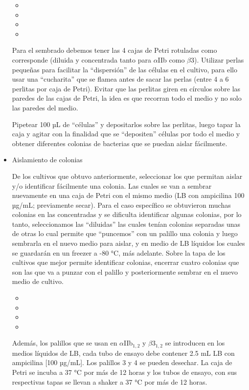 \begin{appendix}
\begin{itemize}
     \begin{itemize}
        \item{}
        \item{}
        \item{}
        \item{}
    \end{itemize}
        

Para el sembrado debemos tener las 4 cajas de Petri rotuladas como corresponde (diluida y concentrada tanto para $\alpha$IIb como $\beta$3). Utilizar perlas pequeñas para facilitar la “dispersión” de las células en el cultivo, para ello usar una “cucharita” que se flamea antes de sacar las perlas (entre 4 a 6 perlitas por caja de Petri). Evitar que las perlitas giren en círculos sobre las paredes de las cajas de Petri, la idea es que recorran todo el medio y no solo las paredes del medio.

Pipetear 100 µL de “células” y depositarlos sobre las perlitas, luego tapar la caja y agitar con la finalidad que se “depositen” células por todo el medio y obtener diferentes colonias de bacterias que se puedan aislar fácilmente. 


\item{Aislamiento de colonias}

De los cultivos que obtuvo anteriormente, seleccionar los que permitan aislar y/o identificar fácilmente una colonia. Las cuales se van a sembrar nuevamente en una caja de Petri con el mismo medio (LB con ampicilina 100 µg/mL; previamente secar). Para el caso específico se obtuvieron muchas colonias en las concentradas y se dificulta identificar algunas colonias, por lo tanto, seleccionamos las “diluidas” las cuales tenían colonias separadas unas de otras lo cual permite que “puncemos” con un palillo una colonia y luego sembrarla en el nuevo medio para aislar, y en medio de LB líquidos los cuales se guardarán en un freezer a -80 °C, más adelante. 
Sobre la tapa de los cultivos que mejor permite identificar colonias, encerrar cuatro colonias que son las que va a punzar con el palillo y posteriormente sembrar en el nuevo medio de cultivo.

     \begin{itemize}
        \item{}
        \item{}
        \item{}
        \item{}
    \end{itemize}


Además, los palillos que se usan en $\alpha$IIb$_{1,2}$ y $\beta$3$_{1,2}$ se introducen en los medios líquidos de LB, cada tubo de ensayo debe contener 2.5 mL LB con ampicilina [100 µg/mL]. Los palillos 3 y 4 se pueden desechar. La caja de Petri se incuba a 37 °C por más de 12 horas y los tubos de ensayo, con sus respectivas tapas se llevan a shaker a 37 °C por más de 12 horas.


\end{itemize}
\end{appendix}
